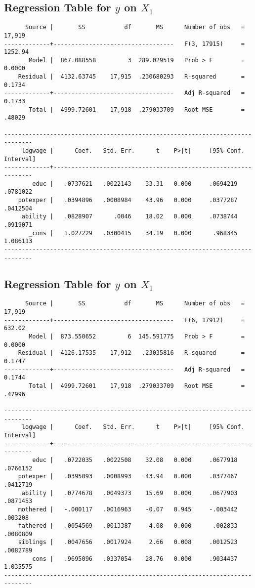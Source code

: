 \documentclass{article}
\begin{document}
\label{sec: 15obs}


\subsection*{Regression Table for $y$ on $X_1$}
\label{sec: table1}
\begin{verbatim}
      Source |       SS           df       MS      Number of obs   =    17,919
-------------+----------------------------------   F(3, 17915)     =   1252.94
       Model |  867.088558         3  289.029519   Prob > F        =    0.0000
    Residual |  4132.63745    17,915  .230680293   R-squared       =    0.1734
-------------+----------------------------------   Adj R-squared   =    0.1733
       Total |  4999.72601    17,918  .279033709   Root MSE        =    .48029

------------------------------------------------------------------------------
     logwage |      Coef.   Std. Err.      t    P>|t|     [95% Conf. Interval]
-------------+----------------------------------------------------------------
        educ |   .0737621   .0022143    33.31   0.000     .0694219    .0781022
    potexper |   .0394896   .0008984    43.96   0.000     .0377287    .0412504
     ability |   .0828907      .0046    18.02   0.000     .0738744    .0919071
       _cons |   1.027229   .0300415    34.19   0.000      .968345    1.086113
------------------------------------------------------------------------------	
\end{verbatim}


\subsection*{Regression Table for $y$ on $X_1$}
\label{sec: table2}
\begin{verbatim}
      Source |       SS           df       MS      Number of obs   =    17,919
-------------+----------------------------------   F(6, 17912)     =    632.02
       Model |  873.550652         6  145.591775   Prob > F        =    0.0000
    Residual |  4126.17535    17,912   .23035816   R-squared       =    0.1747
-------------+----------------------------------   Adj R-squared   =    0.1744
       Total |  4999.72601    17,918  .279033709   Root MSE        =    .47996

------------------------------------------------------------------------------
     logwage |      Coef.   Std. Err.      t    P>|t|     [95% Conf. Interval]
-------------+----------------------------------------------------------------
        educ |   .0722035   .0022508    32.08   0.000     .0677918    .0766152
    potexper |   .0395093   .0008993    43.94   0.000     .0377467    .0412719
     ability |   .0774678   .0049373    15.69   0.000     .0677903    .0871453
    mothered |   -.000117   .0016963    -0.07   0.945     -.003442     .003208
    fathered |   .0054569   .0013387     4.08   0.000      .002833    .0080809
    siblings |   .0047656   .0017924     2.66   0.008     .0012523    .0082789
       _cons |   .9695096   .0337054    28.76   0.000     .9034437    1.035575
------------------------------------------------------------------------------

\end{verbatim}
\end{document}
